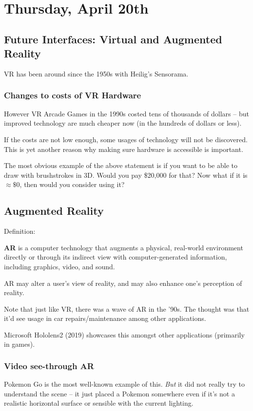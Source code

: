 \section{Thursday, April 20th}
\subsection{Future Interfaces: Virtual and Augmented Reality}
VR has been around since the 1950s with Heilig's Sensorama.

\subsubsection{Changes to costs of VR Hardware}
However VR Arcade Games in the 1990s costed tens of thousands of dollars -- but improved technology are much cheaper now (in the hundreds of dollars or less).

\begin{important}
If the costs are not low enough, some usages of technology will not be discovered. This is yet another reason why making sure hardware is accessible is important.
\end{important}
The most obvious example of the above statement is if you want to be able to draw with brushstrokes in 3D. Would you pay \$20,000 for that? Now what if it is $\approx\$0$, then would you consider using it?

\subsection{Augmented Reality}
Definition:
\begin{shaded}
\textbf{AR} is a computer technology that augments a physical, real-world environment directly or through its indirect view with computer-generated information, including graphics, video, and sound.

AR may alter a user’s view of reality, and may also enhance one’s perception of reality.
\end{shaded}

Note that just like VR, there was a wave of AR in the '90s. The thought was that it'd see usage in car repairs/maintenance among other applications.

Microsoft Hololens2 (2019) showcases this amongst other applications (primarily in games).

\subsubsection{Video see-through AR}
Pokemon Go is the most well-known example of this. \textit{But} it did not really try to understand the scene -- it just placed a Pokemon somewhere even if it's not a realistic horizontal surface or sensible with the current lighting.

